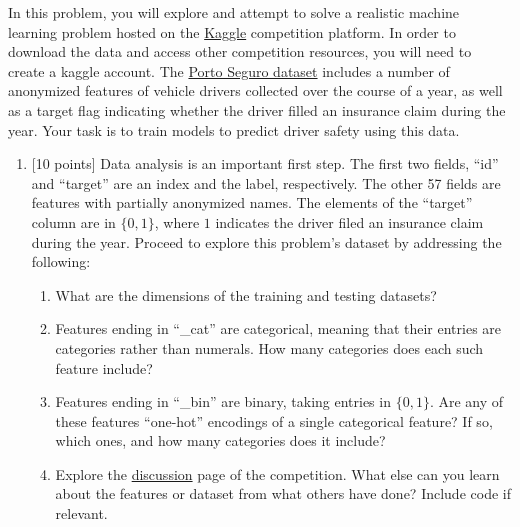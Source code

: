 \documentclass[12pt]{article}
\newenvironment{problem}[2][Problem:]{\begin{trivlist}
\item[\hskip \labelsep {\bfseries #1}\hskip \labelsep {\bfseries #2.}]}{\end{trivlist}}
\begin{document}
\begin{problem}{Porto Seguro Dataset [70 points]}
In this problem, you will explore and attempt to solve a realistic machine learning problem hosted on the \href{https://www.kaggle.com/}{Kaggle} competition platform.
In order to download the data and access other competition resources, you will need to create a kaggle account. 
The \href{https://www.kaggle.com/c/porto-seguro-safe-driver-prediction/data}{Porto Seguro dataset} includes a number of anonymized features of vehicle drivers collected over the course of a year, as well as a target flag indicating whether the driver filled an insurance claim during the year.
Your task is to train models to predict driver safety using this data. 

\begin{enumerate}
    \item {[10 points]} 
    Data analysis is an important first step. 
    The first two fields, ``id'' and ``target'' are an index and the label, respectively. 
    The other 57 fields are features with partially anonymized names. 
    The elements of the ``target'' column are in $\{0,1\}$, where $1$ indicates the driver filed an insurance claim during the year.
    Proceed to explore this problem's dataset by addressing the following:
    \begin{enumerate}
            \item What are the dimensions of the training and testing datasets?
            \item Features ending in ``\_cat'' are categorical, meaning that their entries are categories rather than numerals. How many categories does each such feature include?
            \item Features ending in ``\_bin'' are binary, taking entries in $\{0,1\}$. Are any of these features ``one-hot'' encodings of a single categorical feature? If so, which ones, and how many categories does it include? 
            \item Explore the \href{https://www.kaggle.com/c/porto-seguro-safe-driver-prediction/discussion}{discussion} page of the competition. What else can you learn about the features or dataset from what others have done? Include code if relevant.
    \end{enumerate}


\end{enumerate}
\end{problem}
\end{document}
